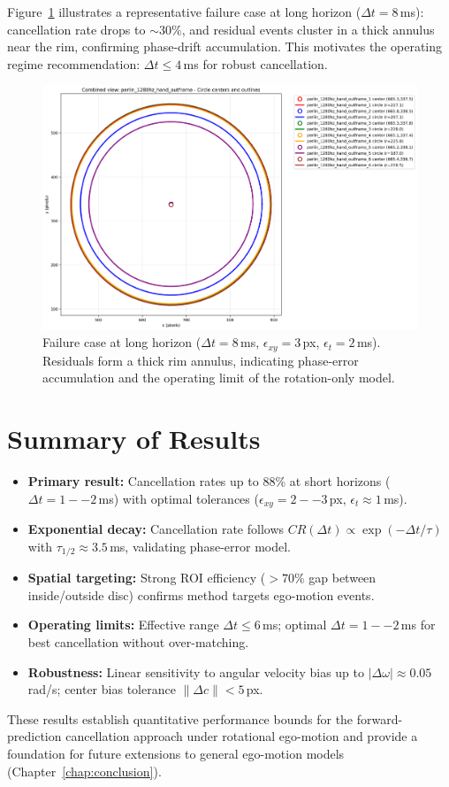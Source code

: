 Figure~\ref{fig:failure_case} illustrates a representative failure case at long horizon ($\Delta t=8$\,ms): cancellation rate drops to $\sim 30\%$, and residual events cluster in a thick annulus near the rim, confirming phase-drift accumulation. This motivates the operating regime recommendation: $\Delta t \leq 4$\,ms for robust cancellation.

\begin{figure}[t]
  \centering
  \includegraphics[width=0.75\linewidth]{../code/pipeline/results_plots/perlin_1280hz_hand_outframe_combined_circles.png}
\caption{Failure case at long horizon ($\Delta t=8$\,ms, $\epsilon_{xy}=3$\,px, $\epsilon_t=2$\,ms). Residuals form a thick rim annulus, indicating phase-error accumulation and the operating limit of the rotation-only model.}
  \label{fig:failure_case}
\end{figure}

\section{Summary of Results}

\begin{itemize}
\item \textbf{Primary result:} Cancellation rates up to 88\% at short horizons ($\Delta t=1--2$\,ms) with optimal tolerances ($\epsilon_{xy}=2--3$\,px, $\epsilon_t \approx 1$\,ms).
\item \textbf{Exponential decay:} Cancellation rate follows $CR(\Delta t) \propto \exp(-\Delta t / \tau)$ with $\tau_{1/2} \approx 3.5$\,ms, validating phase-error model.
\item \textbf{Spatial targeting:} Strong ROI efficiency ($> 70\%$ gap between inside/outside disc) confirms method targets ego-motion events.
\item \textbf{Operating limits:} Effective range $\Delta t \leq 6$\,ms; optimal $\Delta t = 1--2$\,ms for best cancellation without over-matching.
\item \textbf{Robustness:} Linear sensitivity to angular velocity bias up to $|\Delta\omega| \approx 0.05$\,rad/s; center bias tolerance $\|\Delta c\| < 5$\,px.
\end{itemize}

These results establish quantitative performance bounds for the forward-prediction cancellation approach under rotational ego-motion and provide a foundation for future extensions to general ego-motion models (Chapter~\ref{chap:conclusion}).
